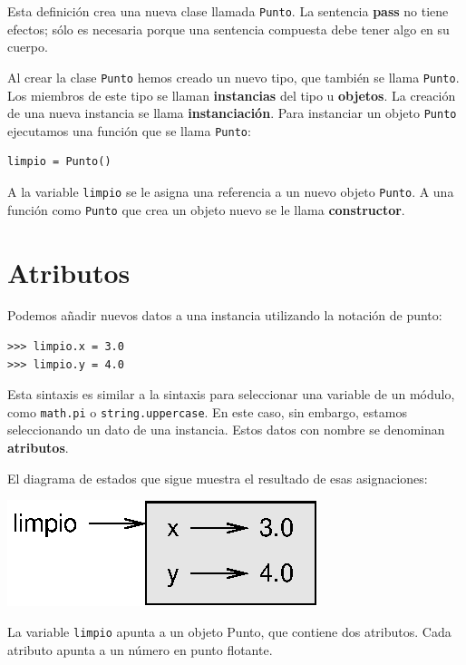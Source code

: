 Esta definición crea una nueva clase llamada \texttt{Punto}. La sentencia
\textbf{pass} no tiene efectos; sólo es necesaria porque una sentencia
compuesta debe tener algo en su cuerpo.

Al crear la clase \texttt{Punto} hemos creado un nuevo tipo, que también
se llama \texttt{Punto}. Los miembros de este tipo se llaman \textbf{instancias}
del tipo u \textbf{objetos}. La creación de una nueva instancia se
llama \textbf{instanciación}. Para instanciar un objeto \texttt{Punto}
ejecutamos una función que se llama \texttt{Punto}:

  
\begin{lstlisting}
limpio = Punto()
\end{lstlisting}
A la variable \texttt{limpio} se le asigna una referencia a un nuevo
objeto \texttt{Punto}. A una función como \texttt{Punto} que crea
un objeto nuevo se le llama \textbf{constructor}.

\section{Atributos}


Podemos añadir nuevos datos a una instancia utilizando la notación
de punto:
\begin{lstlisting}
>>> limpio.x = 3.0
>>> limpio.y = 4.0
\end{lstlisting}
Esta sintaxis es similar a la sintaxis para seleccionar una variable
de un módulo, como \texttt{math.pi} o \texttt{string.uppercase}. En
este caso, sin embargo, estamos seleccionando un dato de una instancia.
Estos datos con nombre se denominan \textbf{atributos}.

El diagrama de estados que sigue muestra el resultado de esas asignaciones:

\beforefig \centerline{\includegraphics{illustrations/point}}
\afterfig

La variable \texttt{limpio} apunta a un objeto Punto, que contiene
dos atributos. Cada atributo apunta a un número en punto flotante.

